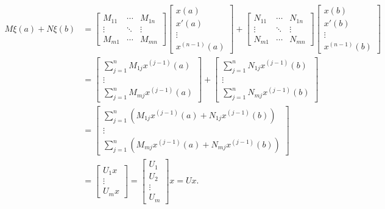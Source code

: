 \documentclass[12pt, oneside, a4paper]{article}
\begin{document}
\begin{align*}
    M\xi(a) + N\xi(b) &= \begin{bmatrix}
        M_{11} & \cdots & M_{1n}\\
        \vdots & \ddots & \vdots\\
        M_{m1} & \cdots & M_{mn}
    \end{bmatrix}\begin{bmatrix}x(a)\\ x'(a)\\ \vdots \\ x^{(n-1)}(a)
        \end{bmatrix} + \begin{bmatrix}
            N_{11} & \cdots & N_{1n}\\
            \vdots & \ddots & \vdots\\
            N_{m1} & \cdots & N_{mn}
        \end{bmatrix}\begin{bmatrix}x(b)\\ x'(b)\\ \vdots \\ x^{(n-1)}(b)
        \end{bmatrix}\\
        &= \begin{bmatrix}
            \sum_{j=1}^n M_{1j}x^{(j-1)}(a)\\
            \vdots\\
            \sum_{j=1}^n M_{mj}x^{(j-1)}(a)
        \end{bmatrix} + \begin{bmatrix}
            \sum_{j=1}^n N_{1j}x^{(j-1)}(b)\\
            \vdots\\
            \sum_{j=1}^n N_{mj}x^{(j-1)}(b)
        \end{bmatrix}\\
        &= \begin{bmatrix}
            \sum_{j=1}^n (M_{1j}x^{(j-1)}(a) + N_{1j}x^{(j-1)}(b))\\
            \vdots\\
            \sum_{j=1}^n (M_{mj}x^{(j-1)}(a) + N_{mj}x^{(j-1)}(b))
        \end{bmatrix}\\
        &= \begin{bmatrix}
            U_1 x\\
            \vdots\\
            U_m x
        \end{bmatrix} = \begin{bmatrix}U_1\\ U_2\\ \vdots \\ U_m
        \end{bmatrix}x = Ux.
\end{align*}
\end{document}
